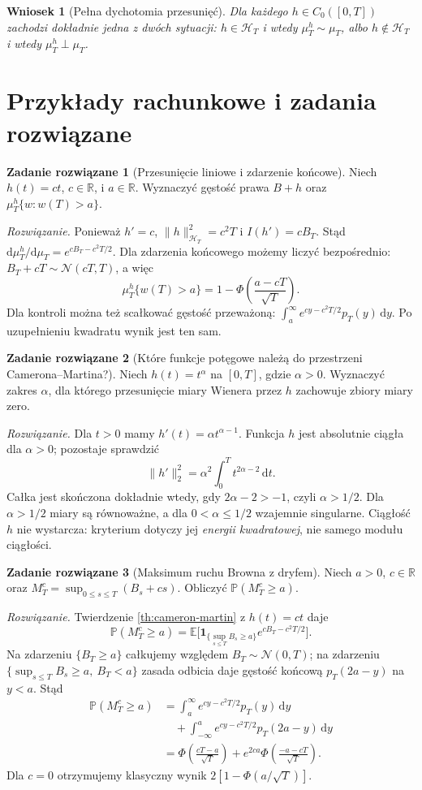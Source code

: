 \documentclass[11pt,a4paper,oneside]{report}
\numberwithin{equation}{chapter}
\theoremstyle{plain}
\newtheorem{wniosek}[twierdzenie]{Wniosek}
\theoremstyle{definition}
\newtheorem{zadanie}{Zadanie rozwiązane}[chapter]
\theoremstyle{remark}
\newcommand{\R}{\mathbb{R}}
\newcommand{\Prob}{\mathbb{P}}
\newcommand{\E}{\mathbb{E}}
\newcommand{\calH}{\mathcal{H}}
\newcommand{\ind}[1]{\mathbf{1}_{#1}}
\newcommand{\dd}{\mathrm{d}}
\newcommand{\Normal}{\mathcal{N}}
\begin{document}
\begin{wniosek}[Pełna dychotomia przesunięć]
Dla każdego $h\in C_0([0,T])$ zachodzi dokładnie jedna
z dwóch sytuacji: $h\in\calH_T$ i wtedy $\mu_T^h\sim\mu_T$,
albo $h\notin\calH_T$ i wtedy $\mu_T^h\perp\mu_T$.
\end{wniosek}

\section{Przykłady rachunkowe i zadania rozwiązane}

\begin{zadanie}[Przesunięcie liniowe i zdarzenie końcowe]
Niech $h(t)=ct$, $c\in\R$, i $a\in\R$.
Wyznaczyć gęstość prawa $B+h$ oraz
$\mu_T^h\{w:w(T)>a\}$.

\emph{Rozwiązanie.} Ponieważ $h'=c$,
$\|h\|_{\calH_T}^2=c^2T$ i $I(h')=cB_T$.
Stąd $\dd\mu_T^h/\dd\mu_T=e^{cB_T-c^2T/2}$.
Dla zdarzenia końcowego możemy liczyć bezpośrednio:
$B_T+cT\sim\Normal(cT,T)$, a więc
\[
\mu_T^h\{w(T)>a\}=1-\Phi\left(\frac{a-cT}{\sqrt T}\right).
\]
Dla kontroli można też scałkować gęstość przeważoną:
$\int_a^\infty e^{cy-c^2T/2}p_T(y)\,\dd y$.
Po uzupełnieniu kwadratu wynik jest ten sam.
\end{zadanie}

\begin{zadanie}[Które funkcje potęgowe należą do przestrzeni Camerona--Martina?]
Niech $h(t)=t^\alpha$ na $[0,T]$, gdzie $\alpha>0$.
Wyznaczyć zakres $\alpha$, dla którego przesunięcie
miary Wienera przez $h$ zachowuje zbiory miary zero.

\emph{Rozwiązanie.} Dla $t>0$ mamy
$h'(t)=\alpha t^{\alpha-1}$. Funkcja $h$ jest
absolutnie ciągła dla $\alpha>0$; pozostaje sprawdzić
\[
\|h'\|_2^2=\alpha^2\int_0^T t^{2\alpha-2}\,\dd t.
\]
Całka jest skończona dokładnie wtedy, gdy
$2\alpha-2>-1$, czyli $\alpha>1/2$.
Dla $\alpha>1/2$ miary są równoważne, a dla
$0<\alpha\le1/2$ wzajemnie singularne.
Ciągłość $h$ nie wystarcza: kryterium dotyczy jej
\emph{energii kwadratowej}, nie samego modułu ciągłości.
\end{zadanie}

\begin{zadanie}[Maksimum ruchu Browna z dryfem]
Niech $a>0$, $c\in\R$ oraz
$M_T^c=\sup_{0\le s\le T}(B_s+cs)$.
Obliczyć $\Prob(M_T^c\ge a)$.

\emph{Rozwiązanie.} Twierdzenie \ref{th:cameron-martin}
z $h(t)=ct$ daje
\[
\Prob(M_T^c\ge a)=\E\bigl[
\ind{\{\sup_{s\le T}B_s\ge a\}}e^{cB_T-c^2T/2}\bigr].
\]
Na zdarzeniu $\{B_T\ge a\}$ całkujemy względem
$B_T\sim\Normal(0,T)$; na zdarzeniu
$\{\sup_{s\le T}B_s\ge a,\ B_T<a\}$
zasada odbicia daje gęstość końcową $p_T(2a-y)$
na $y<a$. Stąd
\[
\begin{split}
\Prob(M_T^c\ge a)
&=\int_a^\infty e^{cy-c^2T/2}p_T(y)\,\dd y\\
&\quad+\int_{-\infty}^{a}e^{cy-c^2T/2}p_T(2a-y)\,\dd y\\
&=\Phi\left(\frac{cT-a}{\sqrt T}\right)
+e^{2ca}\Phi\left(\frac{-a-cT}{\sqrt T}\right).
\end{split}
\]
Dla $c=0$ otrzymujemy klasyczny wynik
$2[1-\Phi(a/\sqrt T)]$.
\end{zadanie}
\end{document}
